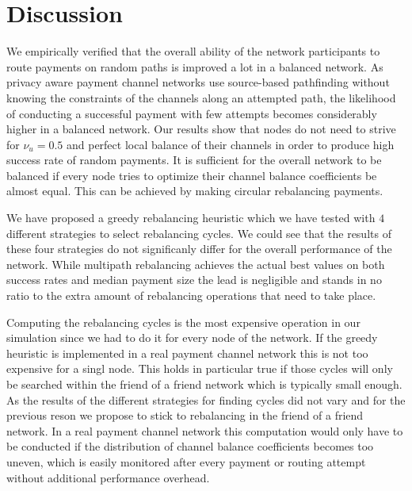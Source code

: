 \documentclass[a4paper]{paper}
\begin{document}
\section{Discussion}
\label{sec:conclusion}
We empirically verified that the overall ability of the network participants to route payments on random paths is improved a lot in a balanced network. 
As privacy aware payment channel networks use source-based pathfinding without knowing the constraints of the channels along an attempted path, the likelihood of conducting a successful payment with few attempts becomes considerably higher in a balanced network.
Our results show that nodes do not need to strive for $\nu_u = 0.5$ and perfect local balance of their channels in order to produce high success rate of random payments.
It is sufficient for the overall network to be balanced if every node tries to optimize their channel balance coefficients be almost equal. 
This can be achieved by making circular rebalancing payments.

We have proposed a greedy rebalancing heuristic which we have tested with $4$ different strategies to select rebalancing cycles.
We could see that the results of these four strategies do not significanly differ for the overall performance of the network.
While multipath rebalancing achieves the actual best values on both success rates and median payment size the lead is negligible and stands in no ratio to the extra amount of rebalancing operations that need to take place.

Computing the rebalancing cycles is the most expensive operation in our simulation since we had to do it for every node of the network.
If the greedy heuristic is implemented in a real payment channel network this is not too expensive for a singl node.
This holds in particular true if those cycles will only be searched within the friend of a friend network which is typically small enough.
As the results of the different strategies for finding cycles did not vary and for the previous reson we propose to stick to rebalancing in the friend of a friend network.
In a real payment channel network this computation would only have to be conducted 
if the distribution of channel balance coefficients becomes too uneven,
which is easily monitored after every payment or routing attempt without additional performance overhead.
\end{document}
